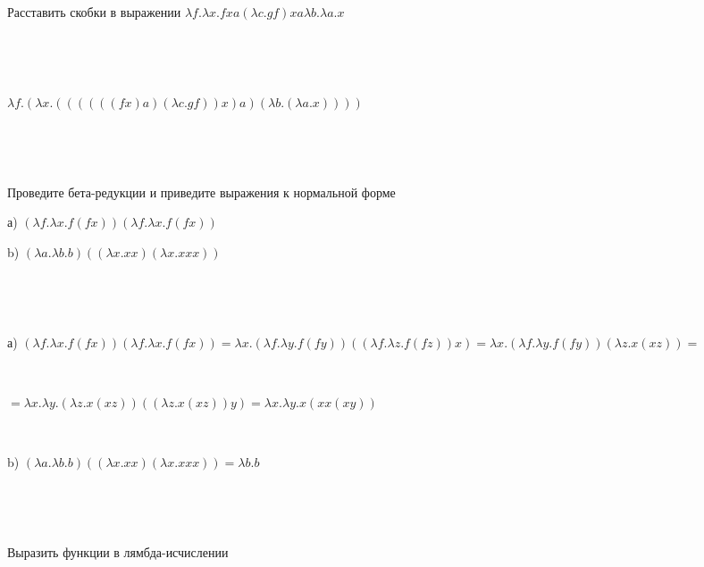 
\begin{problem}{1}

Расставить скобки в выражении $\lambda f. \lambda x. fxa (\lambda c. gf)x a \lambda b. \lambda a. x$

\end{problem}

~\

~\

\begin{solution}

$\lambda f. (\lambda x. ((((((fx)a) (\lambda c. gf))x) a) (\lambda b. (\lambda a. x))))$

\end{solution}

~\

~\


\begin{problem}{2}

Проведите бета-редукции и приведите выражения к нормальной форме

а) $(\lambda f. \lambda x. f (fx)) (\lambda f. \lambda x. f (fx))$  

b) $(\lambda a. \lambda b. b) ((\lambda x. xx)(\lambda x.xxx))$

\end{problem}

~\

~\


\begin{solution}

а) $(\lambda f. \lambda x. f (fx)) (\lambda f. \lambda x. f (fx)) = \lambda x. (\lambda f. \lambda y. f (fy)) ((\lambda f. \lambda z. f (fz)) x) = \lambda x. (\lambda f. \lambda y. f (fy)) (\lambda z. x (xz)) =$ 

~\ 

$= \lambda x. \lambda y. (\lambda z.x(xz)) ((\lambda z.x(xz)) y) = \lambda x. \lambda y. x(x x(xy))$

~\

b) $(\lambda a. \lambda b. b) ((\lambda x. xx)(\lambda x.xxx)) = \lambda b. b$

\end{solution}

~\

~\

\begin{problem}{3}

Выразить функции в лямбда-исчислении

\end{problem}

